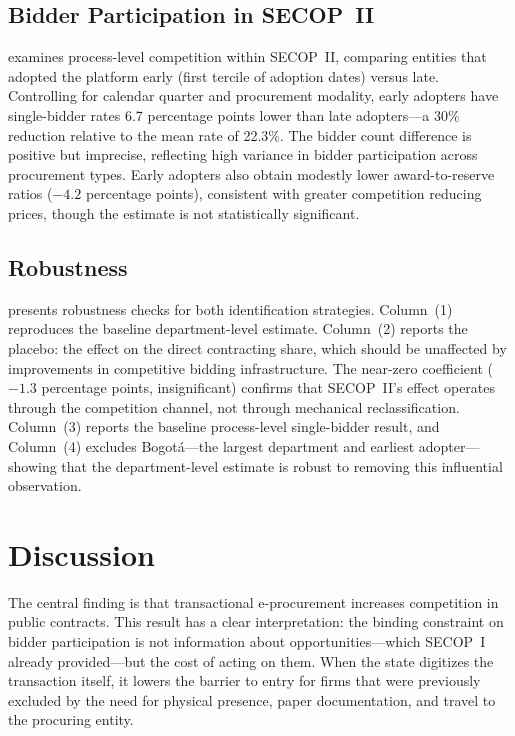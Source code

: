 \documentclass[12pt]{article}
\begin{document}


\subsection{Bidder Participation in SECOP~II}

 examines process-level competition within SECOP~II, comparing entities that adopted the platform early (first tercile of adoption dates) versus late. Controlling for calendar quarter and procurement modality, early adopters have single-bidder rates 6.7 percentage points lower than late adopters---a 30\% reduction relative to the mean rate of 22.3\%. The bidder count difference is positive but imprecise, reflecting high variance in bidder participation across procurement types. Early adopters also obtain modestly lower award-to-reserve ratios ($-4.2$ percentage points), consistent with greater competition reducing prices, though the estimate is not statistically significant.



\subsection{Robustness}

 presents robustness checks for both identification strategies. Column~(1) reproduces the baseline department-level estimate. Column~(2) reports the placebo: the effect on the direct contracting share, which should be unaffected by improvements in competitive bidding infrastructure. The near-zero coefficient ($-1.3$ percentage points, insignificant) confirms that SECOP~II's effect operates through the competition channel, not through mechanical reclassification. Column~(3) reports the baseline process-level single-bidder result, and Column~(4) excludes Bogot\'{a}---the largest department and earliest adopter---showing that the department-level estimate is robust to removing this influential observation.




\section{Discussion}
\label{sec:discussion}

The central finding is that transactional e-procurement increases competition in public contracts. This result has a clear interpretation: the binding constraint on bidder participation is not information about opportunities---which SECOP~I already provided---but the cost of acting on them. When the state digitizes the transaction itself, it lowers the barrier to entry for firms that were previously excluded by the need for physical presence, paper documentation, and travel to the procuring entity.
\end{document}
